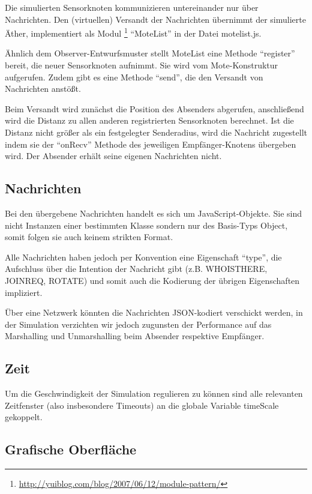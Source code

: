 Die simulierten Sensorknoten kommunizieren untereinander nur über
Nachrichten. Den (virtuellen) Versandt der Nachrichten übernimmt der
simulierte Äther, implementiert als Modul
\footnote{\url{http://yuiblog.com/blog/2007/06/12/module-pattern/}} ``MoteList'' in der
Datei motelist.js.

Ähnlich dem Observer-Entwurfsmuster stellt MoteList eine Methode
``register'' bereit, die neuer Sensorknoten aufnimmt. Sie wird vom
Mote-Konstruktur aufgerufen. Zudem gibt es eine Methode ``send'', die
den Versandt von Nachrichten anstößt.

Beim Versandt wird zunächst die Position des Absenders abgerufen,
anschließend wird die Distanz zu allen anderen registrierten
Sensorknoten berechnet. Ist die Distanz nicht größer als ein
festgelegter Senderadius, wird die Nachricht zugestellt indem sie der
``onRecv'' Methode des jeweiligen Empfänger-Knotens übergeben wird. Der
Absender erhält seine eigenen Nachrichten nicht.

\subsection{Nachrichten}

Bei den übergebene Nachrichten handelt es sich um JavaScript-Objekte.
Sie sind nicht Instanzen einer bestimmten Klasse sondern nur des
Basis-Typs Object, somit folgen sie auch keinem strikten Format.

Alle Nachrichten haben jedoch per Konvention eine Eigenschaft ``type'',
die Aufschluss über die Intention der Nachricht gibt (z.B. WHOISTHERE,
JOINREQ, ROTATE) und somit auch die Kodierung der übrigen Eigenschaften
impliziert.

Über eine Netzwerk könnten die Nachrichten JSON-kodiert verschickt
werden, in der Simulation verzichten wir jedoch zugunsten der
Performance auf das Marshalling und Unmarshalling beim Absender
respektive Empfänger.

\subsection{Zeit}

Um die Geschwindigkeit der Simulation regulieren zu können sind alle
relevanten Zeitfenster (also insbesondere Timeouts) an die globale
Variable timeScale gekoppelt.

\subsection{Grafische Oberfläche}

